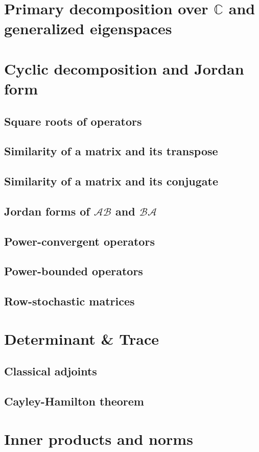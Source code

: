 \documentclass{article}
\theoremstyle{definition}
\begin{document}
\section{Primary decomposition over $\mathbb{C}$ and generalized eigenspaces}
\newpage 
\section{Cyclic decomposition and Jordan form}
\subsection{Square roots of operators}
\subsection{Similarity of a matrix and its transpose}
\subsection{Similarity of a matrix and its conjugate}
\subsection{Jordan forms of $\mathcal{AB}$ and $\mathcal{BA}$}
\subsection{Power-convergent operators}
\subsection{Power-bounded operators}
\subsection{Row-stochastic matrices}
\newpage 
\section{Determinant \& Trace}
\subsection{Classical adjoints}
\subsection{Cayley-Hamilton theorem}

\newpage

\section{Inner products and norms} 
\newpage 
\end{document}
